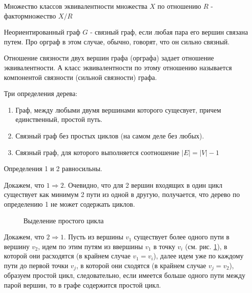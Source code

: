 \begin{Def}
	Множество классов эквивалентности множества $X$ по отношению $R$ - фактормножество $X/R$
\end{Def}

\begin{Def}
	Неориентированный граф $G$ - связный граф, если любая пара его вершин связана путем.
	Про орграф в этом случае, обычно, говорят, что он сильно связный.
\end{Def}

\begin{Th}
	Отношение связности двух вершин графа (орграфа) задает отношение эквивалентности. А класс эквивалентности по этому отношению называется компонентой связности (сильной связности) графа.
\end{Th}

\begin{Def}
Три определения дерева:

\begin{enumerate}
\item Граф, между любыми двумя вершинами которого сущесвует, причем единственный, простой путь.

\item Связный граф без простых циклов (на самом деле без любых).

\item Связный граф, для которого выполняется соотношение $\left| E \right| = \left| V \right| - 1$
\end{enumerate}
\end{Def}

\begin{Th}
	Определения 1 и 2 равносильны.
\end{Th}

\begin{Proof}
	Докажем, что $ 1 \Rightarrow 2 $. Очевидно, что для 2 вершин входящих в один цикл существует как минимум 2 пути из одной в другую, получается, что дерево по определению 1 не может содержать циклов.

\begin{figure}[h]
	\noindent{}
	\caption{Выделение простого цикла}
	\label{pic::simp_circle}
\end{figure}

	Докажем, что $ 2 \Rightarrow 1 $. Пусть из вершины $ v_1 $ существует более одного пути в вершину $ v_2 $, идем по этим путям из ввершины $ v_1 $ в точку $ v_i $ (см. рис. \ref{pic::simp_circle}), в которой они расходятся (в крайнем случае $ v_1 = v_i $), далее идем уже по каждому пути до первой точки $ v_j $, в которой они сходятся (в крайнем случае $ v_j = v_2 $), образуем простой цикл, следовательно, если имеется больше одного пути между парой вершин, то в графе содержится простой цикл. 
\end{Proof}

